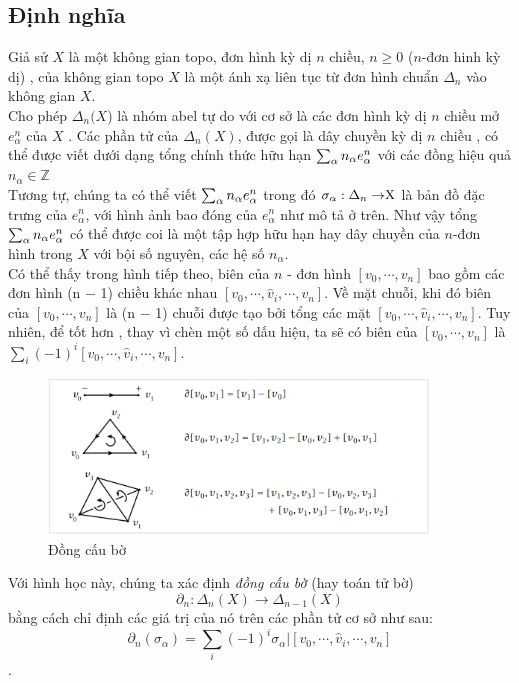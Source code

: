 \subsection[Định nghĩa]{Định nghĩa}
\indent Giả sử \(X\) là một không gian topo, đơn hình kỳ dị \(n\) chiều, \(n\geq0\) (\(n\)-đơn hinh kỳ dị) , của không gian topo \(X\) là một ánh xạ liên tục từ đơn hình chuẩn \(\Delta_n\) vào không gian \(X\). \\
\indent Cho phép \(\Delta_n(X\)) là nhóm abel tự do với cơ sở là các đơn hình kỳ dị \(n\) chiều  mở \(e_\alpha^n\) của \(X\) . Các phần tử của \(\Delta_n(X)\), được gọi là dây chuyền kỳ dị \(n\) chiều , có thể được viết dưới dạng tổng chính thức hữu hạn \(\sum_{\alpha}n_\alpha$$e_\alpha^n$$\) với các đồng hiệu quả \(n_\alpha \in \mathds{Z}\) \\
\indent Tương tự, chúng ta có thể viết \(\sum_{\alpha}n_\alpha$$e_\alpha^n$$\)  trong đó \(\sigma_\alpha : \Delta_n\rightarrow$X$\) là bản đồ đặc trưng của \(e_\alpha^n\), với hình ảnh bao đóng của \(e_\alpha^n\) như mô tả ở trên. Như vậy tổng \(\sum_{\alpha}n_\alpha$$e_\alpha^n$$\) có thể được coi là một tập hợp hữu hạn hay dây chuyền của \(n\)-đơn hình trong \(X\) với bội số nguyên, các hệ số  \(n_\alpha\). \\
\indent Có thể thấy trong hình tiếp theo, biên của \(n\) - đơn hình  \([v_0,\cdots,v_n]\) bao gồm các đơn hình (n − 1) chiều khác nhau \([v_0,\cdots,\hat{v}_i,\cdots,v_n]\). Về mặt chuỗi, khi đó biên của \([v_0,\cdots,v_n]\) là (n − 1) chuỗi được tạo bởi tổng các mặt \([v_0,\cdots, \hat{v}_i,\cdots,v_n]\). Tuy nhiên, để tốt hơn , thay vì chèn một số dấu hiệu, ta sẽ có biên của \([v_0,\cdots,v_n]\) là \(\sum_{i}(-1)^i[v_0,\cdots, \hat{v}_i,\cdots,v_n]\).\\
\begin{figure}[h]  
\includegraphics[width=0.9\textwidth]{figures/chap1_2}
\caption[Đồng cấu bờ ]{Đồng cấu bờ 
\label{fig:chap1_2}}
\end{figure}
\indent Với hình học này, chúng ta xác định \emph{đồng cấu bờ} (hay toán tử bờ) \[\partial_n : \Delta_n(X)\rightarrow\Delta_{n-1} (X)\] bằng cách chỉ định các giá trị của nó trên các phần tử cơ sở như sau: \[\partial_n(\sigma_\alpha) = \sum_{i}(-1)^i\sigma_\alpha|[v_0, \cdots,\hat{v}_i,\cdots,v_n]\].

